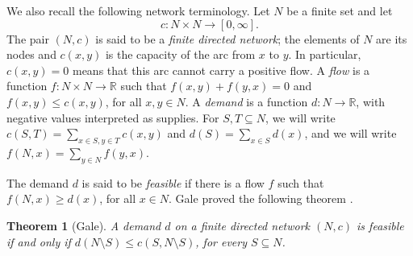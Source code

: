 \documentclass[11pt]{article}
\theoremstyle{plain}
\theoremstyle{remark}
\newtheorem{example}[theorem]{Example}
\theoremstyle{definition}
\theoremstyle{plain}
\newtheorem*{quotedtheorem}{Theorem}
\begin{document}
We also recall the following network terminology. Let $N$ be a finite set and
let $$c\colon N\times N\to[0,\infty].$$ The pair $(N,c)$ is said to be a
\emph{finite directed network}; the elements of $N$ are its nodes and
$c(x,y)$ is the capacity of the arc from $x$ to $y$. In particular,
$c(x,y)=0$ means that this arc cannot carry a positive flow. A \emph{flow}
is a function $f\colon N\times N\to\mathbb R$ such that
$f(x,y)+f(y,x)=0$ and $f(x,y)\le c(x,y)$, for all $x,y\in N$. A
\emph{demand} is a function $d\colon N\to\mathbb R$, with negative values
interpreted as supplies. For $S,T\subseteq N$, we will write
$c(S,T)=\sum_{x\in S,y\in T}c(x,y)$ and $d(S)=\sum_{x\in S}d(x)$, and we
will write $f(N,x)=\sum_{y\in N}f(y,x)$. 

The demand $d$ is said to be
\emph{feasible} if there is a flow $f$ such that $f(N,x)\ge d(x)$, for all
$x\in N$.
Gale proved the following theorem
\cite[Feasibility Theorem]{Gale}.

\begin{quotedtheorem}[Gale]
A demand $d$ on a finite directed network $(N,c)$ is feasible if and only if
$d(N\setminus S)\le c(S,N\setminus S)$, for every $S\subseteq N$.
\end{quotedtheorem}

%
%
%
\endgroup
\end{document}
